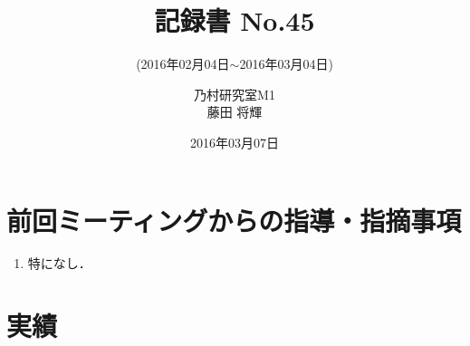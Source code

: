 \documentclass[fleqn, 12pt]{extarticle}
\subtitle{(2016年02月04日$\sim$2016年03月04日)}
\author{乃村研究室M1\\藤田 将輝}
\date{2016年03月07日}
\title{記録書 No.45}
\begin{document}
    \maketitle

    \section{前回ミーティングからの指導・指摘事項}
    \label{sec-1}
    \begin{enumerate}

        \item 特になし．

    \end{enumerate}

    \section{実績}
    \label{sec-2}
\end{document}
